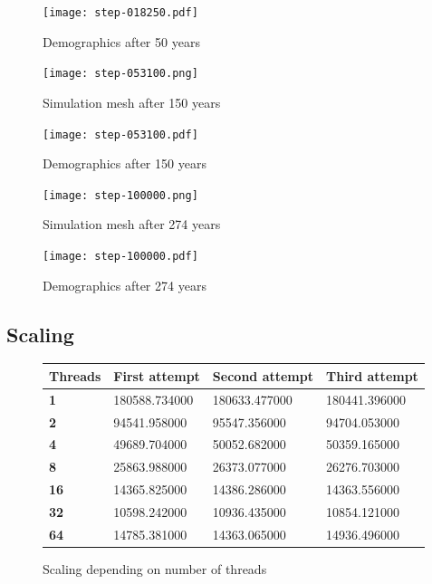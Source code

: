 \documentclass[a4paper]{article}
\begin{document}
\begin{figure}[pht]
    \centering
    \texttt{[image: step-018250.pdf]}
    \caption{Demographics after 50 years}
\end{figure}

\begin{figure}[pht]
    \centering
    \texttt{[image: step-053100.png]}
    \caption{Simulation mesh after 150 years}
\end{figure}

\begin{figure}[pht]
    \centering
    \texttt{[image: step-053100.pdf]}
    \caption{Demographics after 150 years}
\end{figure}

\begin{figure}[pht]
    \centering
    \texttt{[image: step-100000.png]}
    \caption{Simulation mesh after 274 years}
\end{figure}

\begin{figure}[pht]
    \centering
    \texttt{[image: step-100000.pdf]}
    \caption{Demographics after 274 years}
\end{figure}

\subsection{Scaling}

\begin{figure}[ht]
    \centering
    \begin{tabu} {| X[0.8,c,p] || X[1,c,p] | X[1,c,p] | X[1,c,p] |}
        \rowfont{\bfseries}
        \hline
        Threads &
        First attempt &
        Second attempt&
        Third attempt \\
        \hline
        \hline
        \textbf{1} & 180588.734000 & 180633.477000 & 180441.396000 \\
        \hline
        \textbf{2} & 94541.958000 & 95547.356000 & 94704.053000 \\
        \hline
        \textbf{4} & 49689.704000 & 50052.682000 & 50359.165000 \\
        \hline
        \textbf{8} & 25863.988000 & 26373.077000 & 26276.703000 \\
        \hline
        \textbf{16} & 14365.825000 & 14386.286000 & 14363.556000 \\
        \hline
        \textbf{32} & 10598.242000 & 10936.435000 & 10854.121000 \\
        \hline
        \textbf{64} & 14785.381000 & 14363.065000 & 14936.496000 \\
        \hline
    \end{tabu}
    \caption{Scaling depending on number of threads}
\end{figure}
\end{document}
